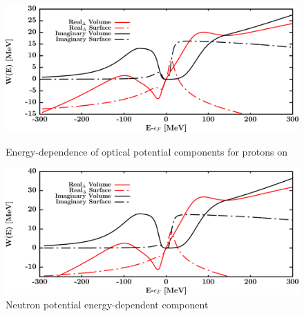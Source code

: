 \begin{figure}[H]
    \centering
    \begin{minipage}{0.45\textwidth}
        \centering
        \includegraphics[width=1.0\textwidth]{figures/ni58_protonPotentials.png}
        \caption{Energy-dependence of optical potential components for protons
        on \niEight}
        \label{DOMFitData_ni58_proton_potentialComponent_energy}
    \end{minipage}\hfill
    \begin{minipage}{0.45\textwidth}
        \centering
        \includegraphics[width=1.0\textwidth]{figures/ni58_neutronPotentials.png}
        \caption{Neutron potential energy-dependent component}
        \label{DOMFitData_ni58_neutron_potentialComponent_energy}
    \end{minipage}
\end{figure}

